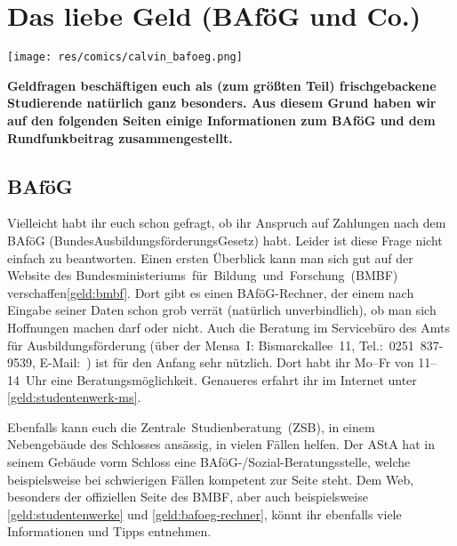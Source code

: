 \section{Das liebe Geld (BAföG und Co.)}

\begin{center}
\vspace{-0.6cm}
\texttt{[image: res/comics/calvin\_bafoeg.png]}
\vspace{-0.4cm}
\end{center}

\begin{multicols*}{2}
\textbf{Geldfragen beschäftigen euch als (zum größten Teil) frischgebackene Studierende natürlich ganz besonders. Aus diesem Grund haben wir auf den folgenden Seiten einige Informationen zum BAföG und dem Rundfunkbeitrag zusammengestellt.}

\subsection*{BAföG}
Vielleicht habt ihr euch schon gefragt, ob ihr Anspruch auf Zahlungen nach dem BAföG (BundesAusbildungsförderungsGesetz) habt. Leider ist diese Frage nicht einfach zu beantworten. Einen ersten Überblick kann man sich gut auf der Website des Bundesministeriums~für~Bildung~und~Forschung~(BMBF) verschaffen\cref{geld:bmbf}. Dort gibt es einen BAföG-Rechner, der einem nach Eingabe seiner Daten schon grob verrät (natürlich unverbindlich), ob man sich Hoffnungen machen darf oder nicht. Auch die Beratung im Servicebüro des Amts für Ausbildungsförderung (über der Mensa~I: Bismarckallee~11, Tel.:~0251~837-9539, E-Mail:~) ist für den Anfang sehr nützlich. Dort habt ihr Mo--Fr von 11--14~Uhr eine Beratungsmöglichkeit. Genaueres erfahrt ihr im Internet unter \cref{geld:studentenwerk-ms}.

Ebenfalls kann euch die Zentrale~Studienberatung~(ZSB), in einem Nebengebäude des Schlosses ansässig, in vielen Fällen helfen. Der AStA hat in seinem Gebäude vorm Schloss eine BAföG-/Sozial-Beratungsstelle, welche beispielsweise bei schwierigen Fällen kompetent zur Seite steht. Dem Web, besonders der offiziellen Seite des BMBF, aber auch beispielsweise \cref{geld:studentenwerke} und \cref{geld:bafoeg-rechner}, könnt ihr ebenfalls viele Informationen und Tipps entnehmen.


\end{multicols*}
